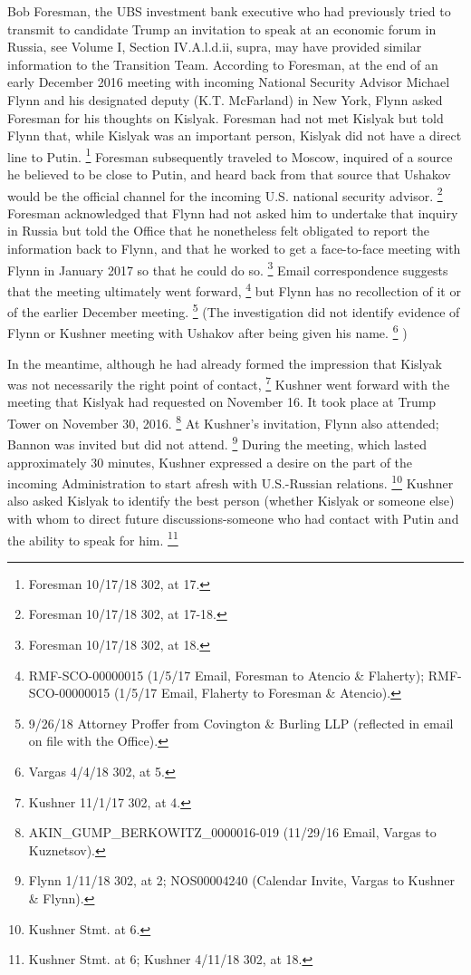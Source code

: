 Bob Foresman, the UBS investment bank executive who had previously tried to transmit to candidate Trump an invitation to speak at an economic forum in Russia, see Volume I, Section IV.A.l.d.ii, supra, may have provided similar information to the Transition Team.
According to Foresman, at the end of an early December 2016 meeting with incoming National Security Advisor Michael Flynn and his designated deputy (K.T. McFarland) in New York, Flynn asked Foresman for his thoughts on Kislyak.
Foresman had not met Kislyak but told Flynn that, while Kislyak was an important person, Kislyak did not have a direct line to Putin.%
\footnote{Foresman 10/17/18 302, at 17.}
Foresman subsequently traveled to Moscow, inquired of a source he believed to be close to Putin, and heard back from that source that Ushakov would be the official channel for the incoming U.S. national security advisor.%
\footnote{Foresman 10/17/18 302, at 17-18.}
Foresman acknowledged that Flynn had not asked him to undertake that inquiry in Russia but told the Office that he nonetheless felt obligated to report the information back to Flynn, and that he worked to get a face-to-face meeting with Flynn in January 2017 so that he could do so.%
\footnote{Foresman 10/17/18 302, at 18.}
Email correspondence suggests that the meeting ultimately went forward,%
\footnote{RMF-SCO-00000015 (1/5/17 Email, Foresman to Atencio \& Flaherty);
RMF-SCO-00000015 (1/5/17 Email, Flaherty to Foresman \& Atencio).}
but Flynn has no recollection of it or of the earlier December meeting.%
\footnote{9/26/18 Attorney Proffer from Covington \& Burling LLP (reflected in email on file with the Office).}
(The investigation did not identify evidence of Flynn or Kushner meeting with Ushakov after being given his name.%
\footnote{Vargas 4/4/18 302, at 5.}
)

In the meantime, although he had already formed the impression that Kislyak was not necessarily the right point of contact,%
\footnote{Kushner 11/1/17 302, at 4.}
Kushner went forward with the meeting that Kislyak had requested on November 16. It took place at Trump Tower on November 30, 2016.%
\footnote{AKIN\_GUMP\_BERKOWITZ\_0000016-019 (11/29/16 Email, Vargas to Kuznetsov).}
At Kushner's invitation, Flynn also attended; Bannon was invited but did not attend.%
\footnote{Flynn 1/11/18 302, at 2;
NOS00004240 (Calendar Invite, Vargas to Kushner \& Flynn).}
During the meeting, which lasted approximately 30 minutes, Kushner expressed a desire on the part of the incoming Administration to start afresh with U.S.-Russian relations.%
\footnote{Kushner Stmt. at 6.}
Kushner also asked Kislyak to identify the best person (whether Kislyak or someone else) with whom to direct future discussions-someone who had contact with Putin and the ability to speak for him.%
\footnote{Kushner Stmt. at 6;
Kushner 4/11/18 302, at 18.}

